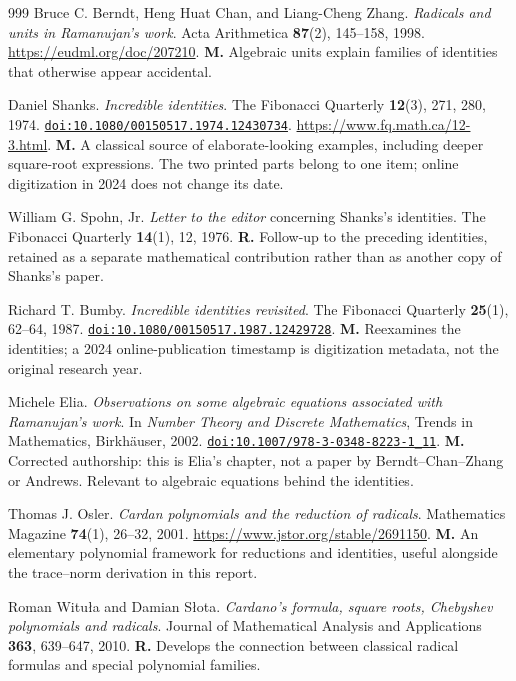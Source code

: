 \documentclass[11pt,a4paper]{article}
\newcommand{\doi}[1]{\href{https://doi.org/#1}{\nolinkurl{doi:#1}}}
\let\sourceurl\url
\theoremstyle{definition}
\theoremstyle{remark}
\numberwithin{equation}{section}
\begin{document}
\begin{thebibliography}{999}
Bruce C. Berndt, Heng Huat Chan, and Liang-Cheng Zhang.
\emph{Radicals and units in Ramanujan's work}.
Acta Arithmetica \textbf{87}(2), 145--158, 1998.
\sourceurl{https://eudml.org/doc/207210}.
\textbf{M.} Algebraic units explain families of identities that otherwise appear accidental.

Daniel Shanks.
\emph{Incredible identities}.
The Fibonacci Quarterly \textbf{12}(3), 271, 280, 1974.
\doi{10.1080/00150517.1974.12430734}.
\sourceurl{https://www.fq.math.ca/12-3.html}.
\textbf{M.} A classical source of elaborate-looking examples, including deeper square-root expressions. The two printed parts belong to one item; online digitization in 2024 does not change its date.

William G. Spohn, Jr.
\emph{Letter to the editor} concerning Shanks's identities.
The Fibonacci Quarterly \textbf{14}(1), 12, 1976.
\textbf{R.} Follow-up to the preceding identities, retained as a separate mathematical contribution rather than as another copy of Shanks's paper.

Richard T. Bumby.
\emph{Incredible identities revisited}.
The Fibonacci Quarterly \textbf{25}(1), 62--64, 1987.
\doi{10.1080/00150517.1987.12429728}.
\textbf{M.} Reexamines the identities; a 2024 online-publication timestamp is digitization metadata, not the original research year.

Michele Elia.
\emph{Observations on some algebraic equations associated with Ramanujan's work}.
In \emph{Number Theory and Discrete Mathematics}, Trends in Mathematics, Birkh\"auser, 2002.
\doi{10.1007/978-3-0348-8223-1_11}.
\textbf{M.} Corrected authorship: this is Elia's chapter, not a paper by Berndt--Chan--Zhang or Andrews. Relevant to algebraic equations behind the identities.

Thomas J. Osler.
\emph{Cardan polynomials and the reduction of radicals}.
Mathematics Magazine \textbf{74}(1), 26--32, 2001.
\sourceurl{https://www.jstor.org/stable/2691150}.
\textbf{M.} An elementary polynomial framework for reductions and identities, useful alongside the trace--norm derivation in this report.

Roman Witu\l a and Damian S\l ota.
\emph{Cardano's formula, square roots, Chebyshev polynomials and radicals}.
Journal of Mathematical Analysis and Applications \textbf{363}, 639--647, 2010.
\textbf{R.} Develops the connection between classical radical formulas and special polynomial families.


\end{thebibliography}
\end{document}
